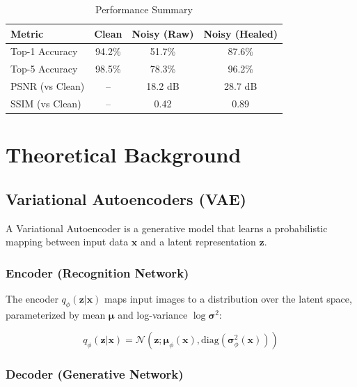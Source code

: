 \documentclass[11pt,a4paper]{article}
\begin{document}
\begin{table}[H]
    \centering
    \caption{Performance Summary}
    \label{tab:performance-summary}
    \begin{tabular}{lccc}
        \toprule
        \textbf{Metric} & \textbf{Clean} & \textbf{Noisy (Raw)} & \textbf{Noisy (Healed)} \\
        \midrule
        Top-1 Accuracy & 94.2\% & 51.7\% & 87.6\% \\
        Top-5 Accuracy & 98.5\% & 78.3\% & 96.2\% \\
        PSNR (vs Clean) & -- & 18.2 dB & 28.7 dB \\
        SSIM (vs Clean) & -- & 0.42 & 0.89 \\
        \bottomrule
    \end{tabular}
\end{table}

\newpage
\section{Theoretical Background}
\label{sec:theory}

\subsection{Variational Autoencoders (VAE)}

A Variational Autoencoder is a generative model that learns a probabilistic mapping between input data $\mathbf{x}$ and a latent representation $\mathbf{z}$.

\subsubsection{Encoder (Recognition Network)}

The encoder $q_\phi(\mathbf{z}|\mathbf{x})$ maps input images to a distribution over the latent space, parameterized by mean $\bm{\mu}$ and log-variance $\log\bm{\sigma}^2$:

\begin{equation}
    q_\phi(\mathbf{z}|\mathbf{x}) = \mathcal{N}(\mathbf{z}; \bm{\mu}_\phi(\mathbf{x}), \text{diag}(\bm{\sigma}^2_\phi(\mathbf{x})))
\end{equation}

\subsubsection{Decoder (Generative Network)}
\end{document}

